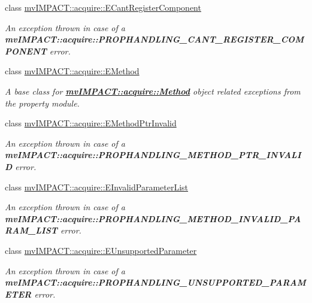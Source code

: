 \begin{DoxyCompactItemize}
class \hyperlink{classmv_i_m_p_a_c_t_1_1acquire_1_1_e_cant_register_component}{mv\+I\+M\+P\+A\+C\+T\+::acquire\+::\+E\+Cant\+Register\+Component}
\begin{DoxyCompactList}\small\item\em An exception thrown in case of a {\bfseries mv\+I\+M\+P\+A\+C\+T\+::acquire\+::\+P\+R\+O\+P\+H\+A\+N\+D\+L\+I\+N\+G\+\_\+\+C\+A\+N\+T\+\_\+\+R\+E\+G\+I\+S\+T\+E\+R\+\_\+\+C\+O\+M\+P\+O\+N\+E\+N\+T} error. \end{DoxyCompactList}\item 
class \hyperlink{classmv_i_m_p_a_c_t_1_1acquire_1_1_e_method}{mv\+I\+M\+P\+A\+C\+T\+::acquire\+::\+E\+Method}
\begin{DoxyCompactList}\small\item\em A base class for {\bfseries \hyperlink{classmv_i_m_p_a_c_t_1_1acquire_1_1_method}{mv\+I\+M\+P\+A\+C\+T\+::acquire\+::\+Method}} object related exceptions from the property module. \end{DoxyCompactList}\item 
class \hyperlink{classmv_i_m_p_a_c_t_1_1acquire_1_1_e_method_ptr_invalid}{mv\+I\+M\+P\+A\+C\+T\+::acquire\+::\+E\+Method\+Ptr\+Invalid}
\begin{DoxyCompactList}\small\item\em An exception thrown in case of a {\bfseries mv\+I\+M\+P\+A\+C\+T\+::acquire\+::\+P\+R\+O\+P\+H\+A\+N\+D\+L\+I\+N\+G\+\_\+\+M\+E\+T\+H\+O\+D\+\_\+\+P\+T\+R\+\_\+\+I\+N\+V\+A\+L\+I\+D} error. \end{DoxyCompactList}\item 
class \hyperlink{classmv_i_m_p_a_c_t_1_1acquire_1_1_e_invalid_parameter_list}{mv\+I\+M\+P\+A\+C\+T\+::acquire\+::\+E\+Invalid\+Parameter\+List}
\begin{DoxyCompactList}\small\item\em An exception thrown in case of a {\bfseries mv\+I\+M\+P\+A\+C\+T\+::acquire\+::\+P\+R\+O\+P\+H\+A\+N\+D\+L\+I\+N\+G\+\_\+\+M\+E\+T\+H\+O\+D\+\_\+\+I\+N\+V\+A\+L\+I\+D\+\_\+\+P\+A\+R\+A\+M\+\_\+\+L\+I\+S\+T} error. \end{DoxyCompactList}\item 
class \hyperlink{classmv_i_m_p_a_c_t_1_1acquire_1_1_e_unsupported_parameter}{mv\+I\+M\+P\+A\+C\+T\+::acquire\+::\+E\+Unsupported\+Parameter}
\begin{DoxyCompactList}\small\item\em An exception thrown in case of a {\bfseries mv\+I\+M\+P\+A\+C\+T\+::acquire\+::\+P\+R\+O\+P\+H\+A\+N\+D\+L\+I\+N\+G\+\_\+\+U\+N\+S\+U\+P\+P\+O\+R\+T\+E\+D\+\_\+\+P\+A\+R\+A\+M\+E\+T\+E\+R} error. \end{DoxyCompactList}\item 

\end{DoxyCompactItemize}
